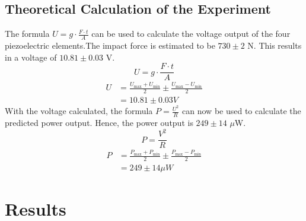 \subsection{Theoretical Calculation of the Experiment}

The formula $U = g \cdot \frac{F \cdot t}{A}$ can be used to calculate the voltage output of the four piezoelectric elements.The impact force is estimated to be $730 \pm 2$ N. This results in a voltage of $10.81 \pm 0.03$ V. 
$$
U = g \cdot \frac{F \cdot t}{A}
$$
\begin{equation*}
    \begin{split}
    U & = \frac{U_{\text{max}}+ U_{\text{min}}}{2} \pm \frac{U_{\text{max}}- U_{\text{min}}}{2}\\
    & = 10.81 \pm 0.03 V
    \end{split}
\end{equation*}
With the voltage calculated, the formula $P = \frac{U^2}{R}$ can now be used to calculate the predicted power output. Hence, the power output is $249 \pm 14$ $\mu$W.
$$
P = \frac{V^2}{R}
$$
\begin{equation*}
    \begin{split}
        P & = \frac{P_{\text{max}}+ P_{\text{min}}}{2} \pm \frac{P_{\text{max}}- P_{\text{min}}}{2}\\
    & = 249 \pm 14 \mu W
    \end{split}
\end{equation*}

\section{Results}


